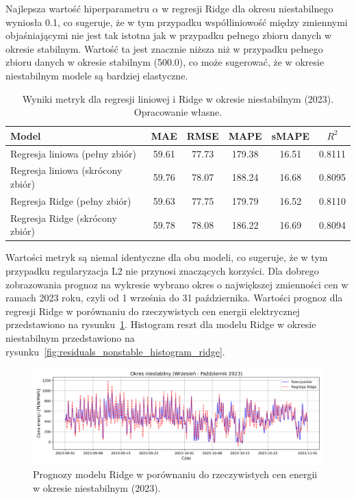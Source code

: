 Najlepsza wartość hiperparametru \(\alpha\) w regresji Ridge dla okresu niestabilnego wyniosła 0.1, co sugeruje, że w tym przypadku współliniowość między zmiennymi objaśniającymi nie jest tak istotna jak w przypadku pełnego zbioru danych w okresie stabilnym. Wartość ta jest znacznie niższa niż w przypadku pełnego zbioru danych w okresie stabilnym (500.0), co może sugerować, że w okresie niestabilnym modele są bardziej elastyczne.

\begin{table}[h]
    \centering
        \caption{Wyniki metryk dla regresji liniowej i Ridge w okresie niestabilnym (2023). Opracowanie własne.}
        \label{tab:linear_regression_results}
        \begin{tabular}{|l|c|c|c|c|c|}
            \hline
            \textbf{Model} & \textbf{MAE} & \textbf{RMSE} & \textbf{MAPE} & \textbf{sMAPE} & \textbf{\(R^2\)} \\
            \hline
            Regresja liniowa (pełny zbiór) & 59.61 & 77.73 & 179.38 & 16.51 & 0.8111 \\
            Regresja liniowa (skrócony zbiór) & 59.76 & 78.07 & 188.24 & 16.68 & 0.8095 \\
            Regresja Ridge (pełny zbiór) & 59.63 & 77.75 & 179.79 & 16.52 & 0.8110 \\
            Regresja Ridge (skrócony zbiór) & 59.78 & 78.08 & 186.22 & 16.69 & 0.8094 \\
            \hline
        \end{tabular}
\end{table}

Wartości metryk są niemal identyczne dla obu modeli, co sugeruje, że w tym przypadku regularyzacja L2 nie przynosi znaczących korzyści.\newline
Dla dobrego zobrazowania prognoz na wykresie wybrano okres o największej zmienności cen w ramach 2023 roku, czyli od 1 września do 31 października. Wartości prognoz dla regresji Ridge w porównaniu do rzeczywistych cen energii elektrycznej przedstawiono na rysunku~\ref{fig:ridge_predictions_full_sep_oct_2023}. Histogram reszt dla modelu Ridge w okresie niestabilnym przedstawiono na rysunku~\ref{fig:residuals_nonstable_histogram_ridge}.

\begin{figure}[H]
    \centering
    \includegraphics[width=1.0\textwidth]{../../plots/predicts/ridge_predictions_full_sep_oct_2023.png}
    \caption{Prognozy modelu Ridge w porównaniu do rzeczywistych cen energii w okresie niestabilnym (2023).}
    \label{fig:ridge_predictions_full_sep_oct_2023}
\end{figure} 

